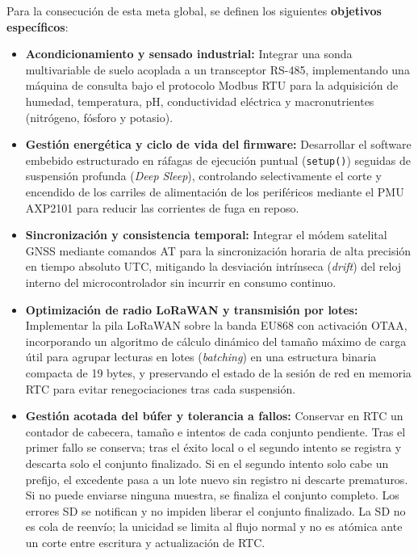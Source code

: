 Para la consecución de esta meta global, se definen los siguientes \textbf{objetivos específicos}:
\begin{itemize}
    \item \textbf{Acondicionamiento y sensado industrial:} Integrar una sonda multivariable de suelo acoplada a un transceptor RS-485, implementando una máquina de consulta bajo el protocolo Modbus RTU para la adquisición de humedad, temperatura, pH, conductividad eléctrica y macronutrientes (nitrógeno, fósforo y potasio).

    \item \textbf{Gestión energética y ciclo de vida del firmware:} Desarrollar el software embebido estructurado en ráfagas de ejecución puntual (\texttt{setup()}) seguidas de suspensión profunda (\textit{Deep Sleep}), controlando selectivamente el corte y encendido de los carriles de alimentación de los periféricos mediante el PMU AXP2101 para reducir las corrientes de fuga en reposo.

    \item \textbf{Sincronización y consistencia temporal:} Integrar el módem satelital GNSS mediante comandos AT para la sincronización horaria de alta precisión en tiempo absoluto UTC, mitigando la desviación intrínseca (\textit{drift}) del reloj interno del microcontrolador sin incurrir en consumo continuo.

    \item \textbf{Optimización de radio LoRaWAN y transmisión por lotes:} Implementar la pila LoRaWAN sobre la banda EU868 con activación OTAA, incorporando un algoritmo de cálculo dinámico del tamaño máximo de carga útil para agrupar lecturas en lotes (\textit{batching}) en una estructura binaria compacta de 19 bytes, y preservando el estado de la sesión de red en memoria RTC para evitar renegociaciones tras cada suspensión.

    \item \textbf{Gestión acotada del búfer y tolerancia a fallos:} Conservar en RTC un contador de cabecera, tamaño e intentos de cada conjunto pendiente. Tras el primer fallo se conserva; tras el éxito local o el segundo intento se registra y descarta solo el conjunto finalizado. Si en el segundo intento solo cabe un prefijo, el excedente pasa a un lote nuevo sin registro ni descarte prematuros. Si no puede enviarse ninguna muestra, se finaliza el conjunto completo. Los errores SD se notifican y no impiden liberar el conjunto finalizado. La SD no es cola de reenvío; la unicidad se limita al flujo normal y no es atómica ante un corte entre escritura y actualización de RTC.


\end{itemize}
